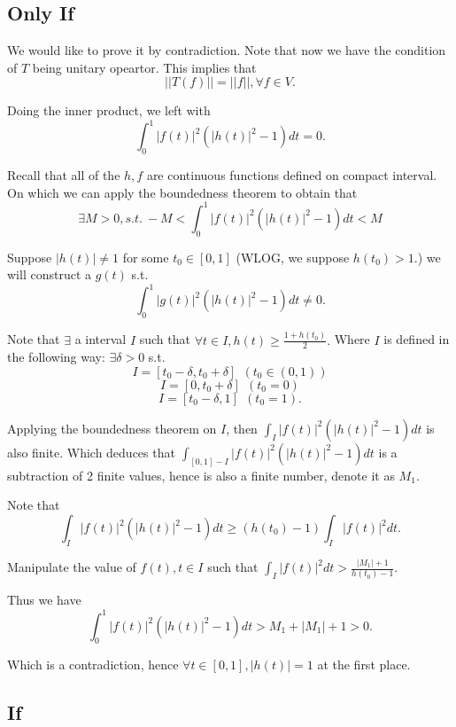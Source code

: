 \documentclass[12pt]{article}%
\begin{document}
\subsection{Only If}

We would like to prove it by contradiction. Note that now we have the condition of 
$T$ being unitary opeartor. This implies that 
$$||T(f)||=||f||, \forall f\in V.$$

Doing the inner product, we left with 
$$\int_{0}^1 |f(t)|^2 (|h(t)|^2-1)dt=0.$$

Recall that all of the $h,f$ are continuous functions defined on compact interval.
On which we can apply the boundedness theorem to obtain that 
$$\exists M>0, s.t.~-M<\int_{0}^1 |f(t)|^2 (|h(t)|^2-1)dt< M$$

Suppose $|h(t)|\neq 1$ for some $t_0 \in [0,1]$ (WLOG, we suppose $h(t_0)>1.$) we will construct a $g(t)$ s.t. 
$$\int_{0}^1 |g(t)|^2 (|h(t)|^2-1)dt \neq0.$$

Note that $\exists$ a interval $I$ such that $\forall t\in I, h(t)\geq \frac{1+h(t_0)}{2}.$ 
Where $I$ is defined in the following way: $\exists \delta>0 $ s.t. 
$$I=[t_0-\delta,t_0+\delta]~~(t_0 \in (0,1))$$
$$I=[0,t_0+\delta]~~(t_0 =0)$$
$$I=[t_0-\delta,1]~~(t_0 =1).$$

Applying the boundedness theorem on $I$, then $\int_{I} |f(t)|^2 (|h(t)|^2-1)dt$ is also finite. 
Which deduces that $\int_{[0,1]-I} |f(t)|^2 (|h(t)|^2-1)dt$ is a subtraction of 2 finite values, 
hence is also a finite number, denote it as $M_1$. 

Note that $$\int_{I} |f(t)|^2 (|h(t)|^2-1)dt \geq (h(t_0)-1)\int_{I} |f(t)|^2 dt.$$

Manipulate the value of $f(t), t\in I$ such that $\int_{I} |f(t)|^2 dt > \frac{|M_1|+1}{h(t_0)-1}.$

Thus we have $$\int_{0}^1 |f(t)|^2 (|h(t)|^2-1)dt>M_1 + |M_1| +1>0.$$

Which is a contradiction, hence $\forall t\in [0,1], |h(t)|=1$ at the first place.

\subsection{If}
\end{document}

